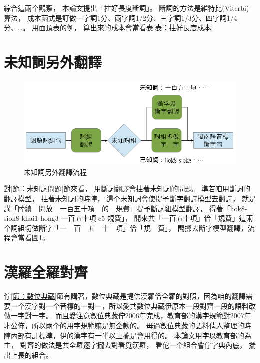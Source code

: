 綜合這兩个觀察，
本論文提出「拄好長度斷詞」。
斷詞的方法是維特比(Viterbi)算法，
成本函式是訂做一字詞1分、兩字詞1/2分、三字詞1/3分、四字詞1/4分、…。
用面頂表的例，
算出來的成本會當看表\ref{表：拄好長度成本}



\section{未知詞另外翻譯}
\label{節：未知詞另外翻譯}

\begin{figure}
\centerline{\includegraphics[keepaspectratio,width=40em]{圖/未知詞另外翻譯}}
\caption{未知詞另外翻譯流程}
\label{未知詞另外翻譯}
\end{figure}

對\ref{節：未知詞問題}節來看，
用斷詞翻譯會拄著未知詞的問題。
準若咱用斷詞的翻譯模型，
拄著未知詞的時陣，
這个未知詞會使提予斷字翻譯模型去翻譯，
就是講「陸續　開放　一百五十項　的　規費」提予斷詞組模型翻譯，
得著「liok8-siok8 khai1-hong3 一百五十項 e5 規費」，
閣來共「一百五十項」佮「規費」這兩个詞組切做斷字「一　百　五　十　項」佮「規　費」，
閣擲去斷字模型翻譯，流程會當看圖\ref{未知詞另外翻譯}。


\section{漢羅全羅對齊}
\label{節：漢羅全羅對齊}
佇\ref{節：數位典藏}節有講著，數位典藏是提供漢羅佮全羅的對照，因為咱的翻譯需要一个漢字對一个音標的一對一，所以愛共數位典藏伊原本一段對齊一段的語料改做一字對一字。
而且愛注意數位典藏佇2006年完成，教育部的漢字規範對2007年才公佈，所以兩个的用字規範嘛是無仝款的。
毋過數位典藏的語料倩人整理的時陣內部有訂標準，伊的漢字有一半以上攏是會用得的。
本論文用字以教育部的為主，
對齊的做法是共全羅逐字攏去對看覓漢羅，
看佗一个組合會佇字典內底，
揣出上長的組合。

